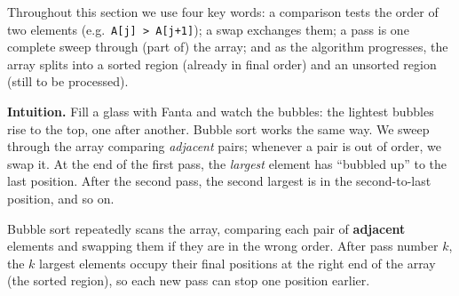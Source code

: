\documentclass[11pt]{article}
\newcommand{\cle}[1]{{\popxbold\color{popdark}#1}}
\newcounter{popsec}
\newcounter{popsub}
\newcommand{\courssub}[1]{%
  \stepcounter{popsub}%
  \par\vspace{9pt}\noindent{\popxbold\fontsize{11.5}{13}\selectfont\color{popink}{\color{poporange}\thepopsec.\thepopsub}\hspace{6pt}#1}\par\nopagebreak\vspace{4pt}
}
\begin{document}
Throughout this section we use four key words: a \cle{comparison} tests the order of two elements (e.g.\ \texttt{A[j] > A[j+1]}); a \cle{swap} exchanges them; a \cle{pass} is one complete sweep through (part of) the array; and as the algorithm progresses, the array splits into a \cle{sorted region} (already in final order) and an \cle{unsorted region} (still to be processed).

\courssub{Bubble Sort}

\textbf{Intuition.} Fill a glass with Fanta and watch the bubbles: the lightest bubbles rise to the top, one after another. Bubble sort works the same way. We sweep through the array comparing \emph{adjacent} pairs; whenever a pair is out of order, we swap it. At the end of the first pass, the \emph{largest} element has ``bubbled up'' to the last position. After the second pass, the second largest is in the second-to-last position, and so on.

\begin{definition}
\cle{Bubble sort} repeatedly scans the array, comparing each pair of \textbf{adjacent} elements and swapping them if they are in the wrong order. After pass number $k$, the $k$ largest elements occupy their final positions at the right end of the array (the sorted region), so each new pass can stop one position earlier.
\end{definition}
\end{document}
